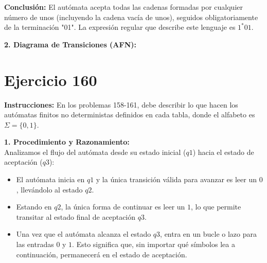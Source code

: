 \documentclass[12pt]{article}
\begin{document}
\vspace{0.3cm}
\textbf{Conclusión:} El autómata acepta todas las cadenas formadas por cualquier número de unos (incluyendo la cadena vacía de unos), seguidos obligatoriamente de la terminación "01". La expresión regular que describe este lenguaje es $1^{*}01$.

\vspace{0.5cm}

\textbf{2. Diagrama de Transiciones (AFN):}

\begin{center}
\end{center}

\section*{Ejercicio 160}

\textbf{Instrucciones:} En los problemas 158-161, debe describir lo que hacen los autómatas finitos no deterministas definidos en cada tabla, donde el alfabeto es $\Sigma=\{0,1\}$.

\vspace{0.5cm}

\textbf{1. Procedimiento y Razonamiento:} \\
Analizamos el flujo del autómata desde su estado inicial ($q1$) hacia el estado de aceptación ($q3$):
\begin{itemize}
    \item El autómata inicia en $q1$ y la única transición válida para avanzar es leer un $0$, llevándolo al estado $q2$.
    \item Estando en $q2$, la única forma de continuar es leer un $1$, lo que permite transitar al estado final de aceptación $q3$.
    \item Una vez que el autómata alcanza el estado $q3$, entra en un bucle o lazo para las entradas $0$ y $1$. Esto significa que, sin importar qué símbolos lea a continuación, permanecerá en el estado de aceptación.
\end{itemize}
\end{document}
